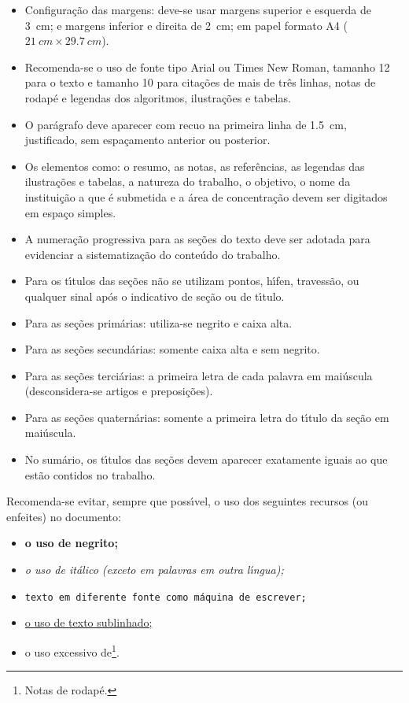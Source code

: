 \begin{itemize}%
\item Configura\c{c}\~ao das margens: deve-se usar margens superior e esquerda de \SI{3}{cm}; e margens inferior e direita de \SI{2}{cm}; em papel formato A4 ($\SI{21}{cm} \times \SI{29,7}{cm}$).
\item Recomenda-se o uso de fonte tipo Arial ou Times New Roman, tamanho 12 para o texto e tamanho 10 para cita\c{c}\~oes de mais de tr\^es linhas, notas de rodap\'e e legendas dos algoritmos, ilustra\c{c}\~oes e tabelas.
\item O par\'agrafo deve aparecer com recuo na primeira linha de \SI{1,5}{cm}, justificado, sem espa\c{c}amento anterior ou posterior.
\item Os elementos como: o resumo, as notas, as refer\^encias, as legendas das ilustra\c{c}\~oes e tabelas, a natureza do trabalho, o objetivo, o nome da institui\c{c}\~ao a que \'e submetida e a \'area de concentra\c{c}\~ao devem ser digitados em espa\c{c}o simples.
\item A numera\c{c}\~ao progressiva para as se\c{c}\~oes do texto deve ser adotada para evidenciar a sistematiza\c{c}\~ao do conte\'udo do trabalho.
\item Para os t\'{\i}tulos das se\c{c}\~oes n\~ao se utilizam pontos, h\'{\i}fen, travess\~ao, ou qualquer sinal ap\'os o indicativo de se\c{c}\~ao ou de t\'{\i}tulo.
\item Para as se\c{c}\~oes prim\'arias: utiliza-se negrito e caixa alta.
\item Para as se\c{c}\~oes secund\'arias: somente caixa alta e sem negrito.
\item Para as se\c{c}\~oes terci\'arias: a primeira letra de cada palavra em mai\'uscula (desconsidera-se artigos e preposi\c{c}\~oes).
\item Para as se\c{c}\~oes quatern\'arias: somente a primeira letra do t\'{\i}tulo da se\c{c}\~ao em mai\'uscula.
\item No sum\'ario, os t\'{\i}tulos das se\c{c}\~oes devem aparecer exatamente iguais ao que est\~ao contidos no trabalho.
\end{itemize}

Recomenda-se evitar, sempre que poss\'{\i}vel, o uso dos seguintes recursos (ou enfeites) no documento:

\begin{itemize}%
\item \textbf{o uso de negrito;}
\item \textit{o uso de it\'alico (exceto em palavras em outra l\'{\i}ngua);}
\item \texttt{texto em diferente fonte como m\'aquina de escrever;}
\item \underline{o uso de texto sublinhado;}
\item o uso excessivo de\footnote{Notas de rodap\'e.}.
\end{itemize}

